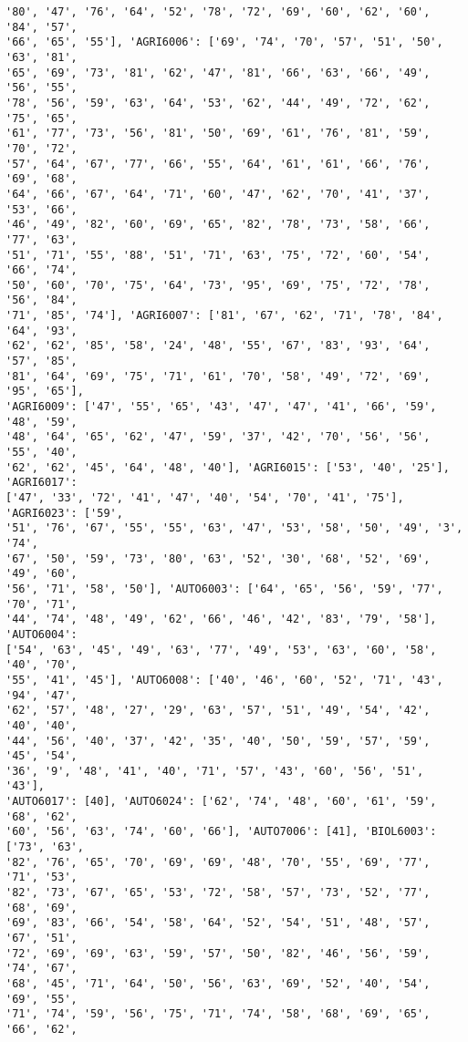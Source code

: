 \documentclass[11pt]{article}
\begin{document}
\begin{Verbatim}[commandchars=\\\{\}]
'80', '47', '76', '64', '52', '78', '72', '69', '60', '62', '60', '84', '57',
'66', '65', '55'], 'AGRI6006': ['69', '74', '70', '57', '51', '50', '63', '81',
'65', '69', '73', '81', '62', '47', '81', '66', '63', '66', '49', '56', '55',
'78', '56', '59', '63', '64', '53', '62', '44', '49', '72', '62', '75', '65',
'61', '77', '73', '56', '81', '50', '69', '61', '76', '81', '59', '70', '72',
'57', '64', '67', '77', '66', '55', '64', '61', '61', '66', '76', '69', '68',
'64', '66', '67', '64', '71', '60', '47', '62', '70', '41', '37', '53', '66',
'46', '49', '82', '60', '69', '65', '82', '78', '73', '58', '66', '77', '63',
'51', '71', '55', '88', '51', '71', '63', '75', '72', '60', '54', '66', '74',
'50', '60', '70', '75', '64', '73', '95', '69', '75', '72', '78', '56', '84',
'71', '85', '74'], 'AGRI6007': ['81', '67', '62', '71', '78', '84', '64', '93',
'62', '62', '85', '58', '24', '48', '55', '67', '83', '93', '64', '57', '85',
'81', '64', '69', '75', '71', '61', '70', '58', '49', '72', '69', '95', '65'],
'AGRI6009': ['47', '55', '65', '43', '47', '47', '41', '66', '59', '48', '59',
'48', '64', '65', '62', '47', '59', '37', '42', '70', '56', '56', '55', '40',
'62', '62', '45', '64', '48', '40'], 'AGRI6015': ['53', '40', '25'], 'AGRI6017':
['47', '33', '72', '41', '47', '40', '54', '70', '41', '75'], 'AGRI6023': ['59',
'51', '76', '67', '55', '55', '63', '47', '53', '58', '50', '49', '3', '74',
'67', '50', '59', '73', '80', '63', '52', '30', '68', '52', '69', '49', '60',
'56', '71', '58', '50'], 'AUTO6003': ['64', '65', '56', '59', '77', '70', '71',
'44', '74', '48', '49', '62', '66', '46', '42', '83', '79', '58'], 'AUTO6004':
['54', '63', '45', '49', '63', '77', '49', '53', '63', '60', '58', '40', '70',
'55', '41', '45'], 'AUTO6008': ['40', '46', '60', '52', '71', '43', '94', '47',
'62', '57', '48', '27', '29', '63', '57', '51', '49', '54', '42', '40', '40',
'44', '56', '40', '37', '42', '35', '40', '50', '59', '57', '59', '45', '54',
'36', '9', '48', '41', '40', '71', '57', '43', '60', '56', '51', '43'],
'AUTO6017': [40], 'AUTO6024': ['62', '74', '48', '60', '61', '59', '68', '62',
'60', '56', '63', '74', '60', '66'], 'AUTO7006': [41], 'BIOL6003': ['73', '63',
'82', '76', '65', '70', '69', '69', '48', '70', '55', '69', '77', '71', '53',
'82', '73', '67', '65', '53', '72', '58', '57', '73', '52', '77', '68', '69',
'69', '83', '66', '54', '58', '64', '52', '54', '51', '48', '57', '67', '51',
'72', '69', '69', '63', '59', '57', '50', '82', '46', '56', '59', '74', '67',
'68', '45', '71', '64', '50', '56', '63', '69', '52', '40', '54', '69', '55',
'71', '74', '59', '56', '75', '71', '74', '58', '68', '69', '65', '66', '62',

\end{Verbatim}
\end{document}
